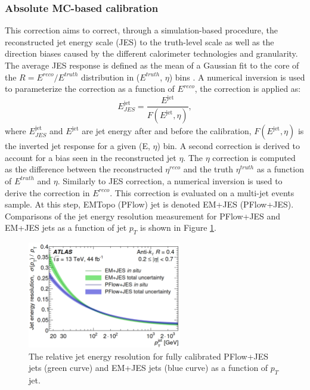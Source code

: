 \subsubsection{Absolute MC-based calibration}
\label{Jet:Cal:chain:JES}
This correction aims to correct, through a simulation-based procedure, the reconstructed jet energy scale (JES) to the truth-level scale as well as the direction biases caused by the different calorimeter technologies and granularity. The average JES response is defined as the mean of a Gaussian fit to the core of the $R=E^{reco}/E^{truth}$ distribution in ($E^{truth}$, $\eta$) bins \cite{Old_JES, Old_JES_Sys}. A numerical inversion is used to parameterize the correction as a function of $E^{reco}$, the correction is applied as: 
\begin{equation}
    E_{JES}^{\mathrm{jet}}=\frac{E^{\mathrm{jet}}}{F(E^{\mathrm{jet}},\eta)},
\end{equation}
where $E_{JES}^{\mathrm{jet}}$ and $E^{\mathrm{jet}}$ are jet energy after and before the  calibration, $F(E^{\mathrm{jet}}, \eta)$ is the inverted jet response for a given (E, $\eta$) bin. A second correction is derived to account for a bias seen in the reconstructed jet $\eta$. The $\eta$ correction is computed as the difference between the reconstructed $\eta^{reco}$ and the truth $\eta^{truth}$ as a function of $E^{truth}$ and $\eta$. Similarly to JES correction, a numerical inversion is used to derive the correction in $E^{reco}$. This correction is evaluated on a multi-jet events sample. At this step, EMTopo (PFlow) jet is denoted EM+JES (PFlow+JES). Comparisons of the jet energy resolution measurement for PFlow+JES and EM+JES jets as a function of jet $p_T$ is shown in Figure \ref{fig:Jet:Cal:chain:JER}.
\begin{figure}[htbp]
    \centering
    \includegraphics[width=0.6\textwidth]{Ch4/Img/Jet_Resolution_Topo_vs_PFlow.png}
    \caption{The relative jet energy resolution for fully calibrated PFlow+JES jets (green curve) and EM+JES jets (blue curve) as a function of $p_T$ jet.}
    \label{fig:Jet:Cal:chain:JER}
\end{figure}

